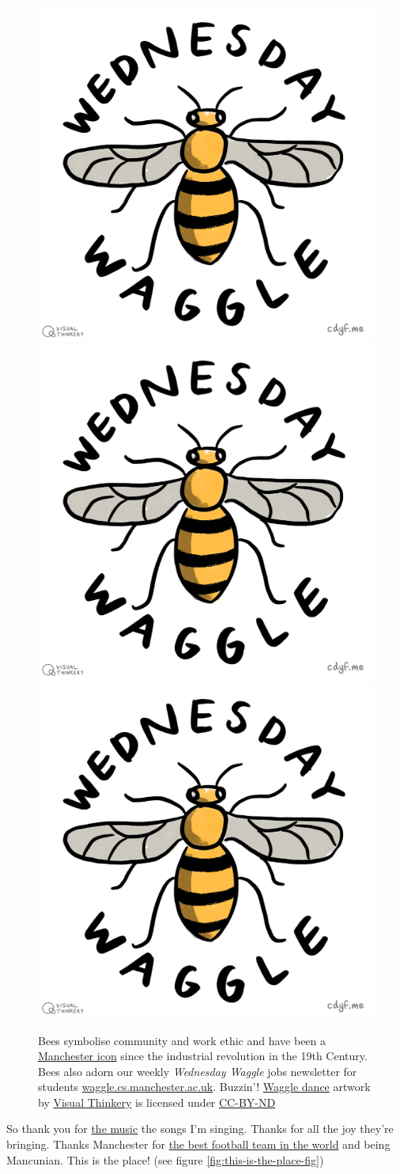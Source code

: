 \documentclass[
]{book}
\begin{document}
\begin{figure}
\includegraphics[width=0.33\linewidth]{images/Wednesday_Waggle} \includegraphics[width=0.33\linewidth]{images/Wednesday_Waggle} \includegraphics[width=0.33\linewidth]{images/Wednesday_Waggle} \caption{Bees symbolise community and work ethic and have been a \href{https://en.wikipedia.org/wiki/Symbols_of_Manchester}{Manchester icon} since the industrial revolution in the 19th Century. Bees also adorn our weekly \emph{Wednesday Waggle} jobs newsletter for students \href{https://waggle.cs.manchester.ac.uk/}{waggle.cs.manchester.ac.uk}. Buzzin'! \href{https://en.wikipedia.org/wiki/Waggle_dance}{Waggle dance} artwork by \href{https://visualthinkery.com/}{Visual Thinkery} is licensed under \href{https://creativecommons.org/licenses/by-nd/4.0/}{CC-BY-ND} 🐝}\label{fig:waggle-fig}
\end{figure}



So thank you for \href{https://en.wikipedia.org/wiki/Popular_music_of_Manchester}{the music} the songs I'm singing. Thanks for all the joy they're bringing. Thanks Manchester for \href{https://en.wikipedia.org/wiki/Manchester_United_F.C.}{the best football team in the world} and being Mancunian. This is the place! (see figure \ref{fig:this-is-the-place-fig})
\end{document}

